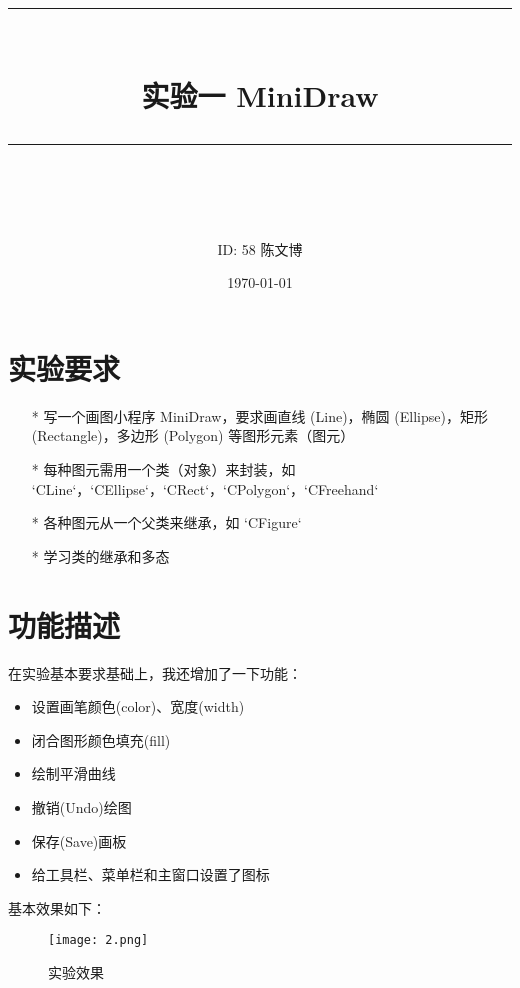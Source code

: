 \documentclass[14pt]{scrartcl} %
\title{	
	\normalfont\normalsize
	\rule{\linewidth}{0.5pt}\\ %
	\vspace{20pt} %
	{\huge 实验一	MiniDraw}\\ %
	\vspace{12pt} %
	\rule{\linewidth}{2pt}\\ %
	\vspace{12pt} %
}
\author{\LARGE ID: 58		陈文博} %
\date{\normalsize\today} %
\begin{document}
\maketitle %


\section{实验要求}


\begin{itemize}
	\item[*] 写一个画图小程序 MiniDraw，要求画直线 (Line)，椭圆 (Ellipse)，矩形 (Rectangle)，多边形 (Polygon) 等图形元素（图元）
	\item[*] 每种图元需用一个类（对象）来封装，如 `CLine`，`CEllipse`，`CRect`，`CPolygon`，`CFreehand` 
	\item[*] 各种图元从一个父类来继承，如 `CFigure` 
	\item[*] 学习类的继承和多态
\end{itemize}

\pagebreak
\section{功能描述}

在实验基本要求基础上，我还增加了一下功能：
\begin{itemize}
	\item 设置画笔颜色(color)、宽度(width)
	\item 闭合图形颜色填充(fill)
	\item 绘制平滑曲线
	\item 撤销(Undo)绘图
	\item 保存(Save)画板
	\item 给工具栏、菜单栏和主窗口设置了图标
\end{itemize}
基本效果如下：

\begin{figure}[h] %
	\centering
	\texttt{[image: 2.png]} %
	\caption{实验效果}
\end{figure}
\end{document}

